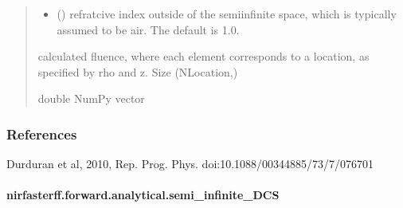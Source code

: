 \documentclass[letterpaper,10pt,english]{sphinxmanual}
\begin{document}
\begin{fulllineitems}
\begin{quote}
\begin{description}
\begin{itemize}
\sphinxAtStartPar
The default is ‘EBC\sphinxhyphen{}exact’.


\item {} 
\sphinxAtStartPar
{} (\sphinxstyleliteralemphasis{\sphinxupquote{, }}) \textendash{} refratcive index outside of the semi\sphinxhyphen{}infinite space, which is typically assumed to be air. The default is 1.0.

\end{itemize}

\sphinxAtStartPar
calculated fluence, where each element corresponds to a location, as specified by rho and z. Size (NLocation,)

\sphinxAtStartPar
double NumPy vector

\end{description}\end{quote}
\subsubsection*{References}

\sphinxAtStartPar
Durduran et al, 2010, Rep. Prog. Phys. doi:10.1088/0034\sphinxhyphen{}4885/73/7/076701

\end{fulllineitems}


\sphinxstepscope


\paragraph{nirfasterff.forward.analytical.semi\_infinite\_DCS}
\label{\detokenize{_autosummary/nirfasterff.forward.analytical.semi_infinite_DCS:nirfasterff-forward-analytical-semi-infinite-dcs}}\label{\detokenize{_autosummary/nirfasterff.forward.analytical.semi_infinite_DCS::doc}}
\end{document}
